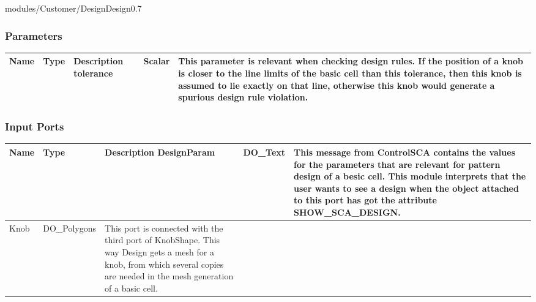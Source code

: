 \begin{htmlonly}
%
\begin{covimg2}{modules/Customer/Design}{Design}{0.7}\end{covimg2}



%
%

%
\subsubsection{Parameters}
%


\begin{longtable}{|p{2.5cm}|p{2cm}|p{8.5cm}|}
\hline
   \bf{Name} & \bf{Type} & \bf{Description} \endhead
\hline\hline
	tolerance & Scalar & This parameter is relevant when checking
        design rules. If the position of a knob is closer to the line limits
        of the basic cell than this tolerance, then this knob is
        assumed to lie exactly on that line, otherwise this knob
        would generate a spurious design rule violation.\\
\hline
\end{longtable}



%
\subsubsection{Input Ports}
%


\begin{longtable}{|p{2.5cm}|p{4.5cm}|p{7cm}|}
\hline
   \bf{Name} & \bf{Type} & \bf{Description} \endhead
\hline\hline
	\textcolor{required}{DesignParam} & DO\_Text & 
                 This message from ControlSCA
                 contains the values for the parameters
                 that are relevant for pattern design of a besic cell.
                 This module interprets that the user wants to
                 see a design when the object attached to this port
                 has got the attribute SHOW\_SCA\_DESIGN.\\
\hline
	\textcolor{required}{Knob} & DO\_Polygons
				       & 
                    This port is connected with the third port of
                    KnobShape. This way Design gets a mesh for a knob,
                    from which several copies are needed in the
                    mesh generation of a basic cell.\\
                     

\end{longtable}
\end{htmlonly}
